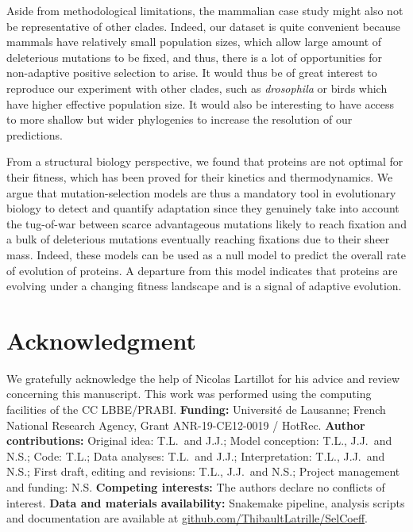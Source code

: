 \documentclass{article}
\begin{document}
    Aside from methodological limitations, the mammalian case study might also not be representative of other clades.
    Indeed, our dataset is quite convenient because mammals have relatively small population sizes, which allow large amount of deleterious mutations to be fixed, and thus, there is a lot of opportunities for non-adaptive positive selection to arise.
    It would thus be of great interest to reproduce our experiment with other clades, such as \textit{drosophila} or birds which have higher effective population size.
    It would also be interesting to have access to more shallow but wider phylogenies to increase the resolution of our predictions.

    From a structural biology perspective, we found that proteins are not optimal for their fitness, which has been proved for their kinetics and thermodynamics.
    We argue that mutation-selection models are thus a mandatory tool in evolutionary biology to detect and quantify adaptation since they genuinely take into account the tug-of-war between scarce advantageous mutations likely to reach fixation and a bulk of deleterious mutations eventually reaching fixations due to their sheer mass.
    Indeed, these models can be used as a null model to predict the overall rate of evolution of proteins\cite{spielman_relationship_2015, dosreis_how_2015}.
    A departure from this model indicates that proteins are evolving under a changing fitness landscape\cite{rodrigue_detecting_2017, tamuri_mutationselection_2021} and is a signal of adaptive evolution\cite{rodrigue_bayesian_2021}.

    \section*{Acknowledgment}
    \label{sec:acknowledgment}
    We gratefully acknowledge the help of Nicolas Lartillot for his advice and review concerning this manuscript.
    This work was performed using the computing facilities of the CC LBBE/PRABI\@.
    \textbf{Funding:}
    Université de Lausanne;
    French National Research Agency, Grant ANR-19-CE12-0019 / HotRec.
    \textbf{Author contributions:}
    Original idea: T.L.\ and J.J.;
    Model conception: T.L., J.J.\ and N.S.;
    Code: T.L.;
    Data analyses: T.L.\ and J.J.;
    Interpretation: T.L., J.J.\ and N.S.;
    First draft, editing and revisions: T.L., J.J.\ and N.S.;
    Project management and funding: N.S\@.
    \textbf{Competing interests:}
    The authors declare no conflicts of interest.
    \textbf{Data and materials availability:}
    Snakemake pipeline, analysis scripts and documentation are available at \href{https://github.com/ThibaultLatrille/SelCoeff}{github.com/ThibaultLatrille/SelCoeff}.
\end{document}
